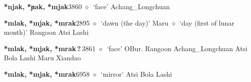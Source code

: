   \begin{list}{}{\leftmargin=1.5em \itemindent=-1.5em}
  \item {\footnotesize \textbf{*njak, *ɲak, *mjak}}{\tiny 3860}
         $\diamond$~`face'
         Achang\_Longchuan 
  \item {\footnotesize \textbf{*mlak, *mjak, *mrak}}{\tiny 2895}
\hspace{1ex}
         $\diamond$~`dawn (the day)'
         Maru 
\hspace{1ex}
         $\diamond$~`day (first of lunar month)'
         Rangoon 
\hspace{1ex}
         Atsi 
\hspace{1ex}
         Lashi 
  \item {\footnotesize \textbf{*mlak, *mjak, *mrak\,?\,}}{\tiny 3861}
\hspace{1ex}
         $\diamond$~`face'
         OBur. 
\hspace{1ex}
         Rangoon 
\hspace{1ex}
         Achang\_Longchuan 
\hspace{1ex}
         Atsi 
\hspace{1ex}
         Bola 
\hspace{1ex}
         Lashi 
\hspace{1ex}
         Maru 
\hspace{1ex}
         Xiandao 
  \item {\footnotesize \textbf{*mlak, *mjak, *mrak}}{\tiny 6958}
\hspace{1ex}
         $\diamond$~`mirror'
         Atsi 
\hspace{1ex}
         Bola 
\hspace{1ex}
         Lashi 
\hspace{1ex}

\end{list}
